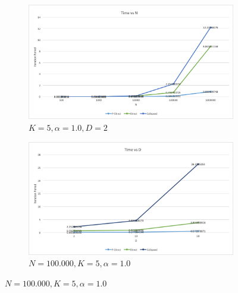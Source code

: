 \documentclass[a4paper]{article}
\begin{document}
\begin{figure}[H]
  \begin{subfigure}[t]{.4\textwidth}
    \centering
    \includegraphics[width=\linewidth]{img/NVK5K5alpha1D2.png}
    \caption{$K=5, \alpha=1.0, D=2$}
  \end{subfigure}
  \hfill
  \begin{subfigure}[t]{.4\textwidth}
    \centering
    \includegraphics[width=\linewidth]{img/N100000K5K5alpha1DV.png}
     \caption{$N=100.000, K=5, \alpha=1.0$}
  \end{subfigure}

  \medskip


\end{figure}
\end{document}
